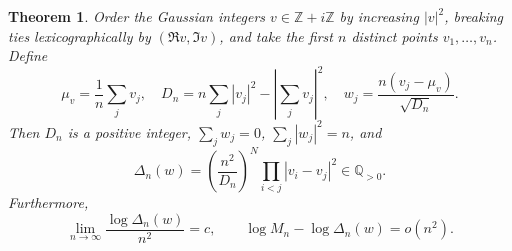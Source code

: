 \documentclass[11pt]{article}
\newtheorem{theorem}{Theorem}[section]
\theoremstyle{remark}
\newcommand{\Q}{\mathbb Q}
\numberwithin{equation}{section}
\begin{document}
\begin{theorem}\label{general_thm_lattice}
Order the Gaussian integers $v\in\mathbb Z+i\mathbb Z$ by increasing
$|v|^2$, breaking ties lexicographically by $(\Re v,\Im v)$, and take
the first $n$ distinct points $v_1,\ldots,v_n$. Define
\begin{equation}\label{general_eq_lattice}
 \mu_v=\frac1n\sum_jv_j,\quad
 D_n=n\sum_j|v_j|^2-\left|\sum_jv_j\right|^2,\quad
 w_j=\frac{n(v_j-\mu_v)}{\sqrt{D_n}}.
\end{equation}
Then $D_n$ is a positive integer, $\sum_jw_j=0$,
$\sum_j|w_j|^2=n$, and
\begin{equation}\label{general_eq_lattice_product}
 \Delta_n(w)=\left(\frac{n^2}{D_n}\right)^N
                 \prod_{i<j}|v_i-v_j|^2\in\Q_{>0}.
\end{equation}
Furthermore,
\begin{equation}\label{general_eq_lattice_asymptotic}
 \lim_{n\to\infty}\frac{\log\Delta_n(w)}{n^2}=c,\qquad
 \log M_n-\log\Delta_n(w)=o(n^2).
\end{equation}
\end{theorem}
\end{document}
